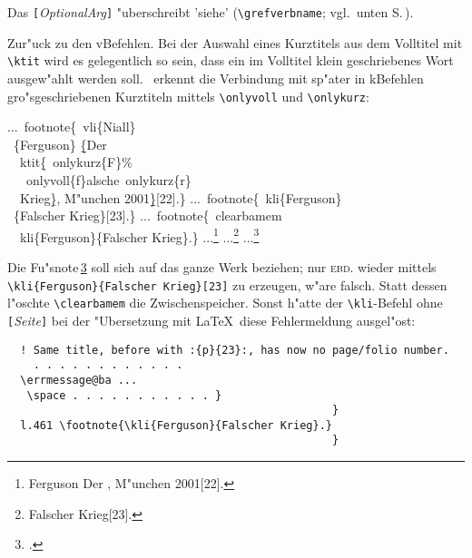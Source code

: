 \documentclass[12pt,a4paper]{article}
\newcommand{\pbs}{\string\ \unskip}
\newcommand{\bs}{\protect\pbs}
\begin{document}
\noindent
Das \texttt{[}\textit{OptionalArg}\texttt{]} "uberschreibt 'siehe'
(\verb|\grefverbname|; vgl.\ unten S.\,\pageref{grefverbname}). 


\vspace{2ex}\noindent
Zur"uck zu den v\fhy Befehlen. Bei der Auswahl eines Kurztitels aus
dem Volltitel mit \verb|\ktit| wird es gelegentlich so sein, dass ein im
Volltitel klein geschriebenes Wort ausgew"ahlt werden soll. \BibArts\
erkennt die Verbindung mit sp"ater in k\fhy Befehlen gro"sgeschriebenen 
Kurztiteln mittels \verb|\onlyvoll| und \verb|\onlykurz|:

\label{Ferguson}%
\Doppelbox
{...\bs footnote\{\bs vli\{Niall\}
  \\ \ \{Ferguson\} \b{\b{\{}}Der
  \\ \ \bs ktit\b{\{}\bs onlykurz\{F\}\%
  \\ \ \ \bs onlyvoll\{f\}alsche\bs onlykurz\{r\} 
  \\ \ \ Krieg\b{\}}, M"unchen 2001\b{\b{\}}}[22].\}
 ...\bs footnote\{\bs kli\{Ferguson\}
   \\ \ \{Falscher Krieg\}[23].\}
 ...\bs footnote\{\bs clearbamem 
 \\ \ \bs kli\{Ferguson\}\{Falscher Krieg\}.\} 
}
{...\footnote{
      {Ferguson} {Der
     ,
            M"unchen 2001}[22].}
 ...\footnote{
      {Falscher Krieg}[23].}
 ...\footnote{\clearbamem {}.\label{clearbamem}} 
}

\vspace{.5ex}\noindent 
Die Fu"snote\,\ref{clearbamem} soll sich auf das ganze 
Werk beziehen; nur \textsc{ebd.} wieder mittels \verb|\kli{Ferguson}{Falscher Krieg}[23]|
zu erzeugen, w"are falsch. Statt dessen l"oschte \verb|\clearbamem| die 
Zwischenspeicher. Sonst h"atte der \verb|\kli|-Befehl ohne \verb|[|\textit{Seite}\verb|]|
bei der "Ubersetzung mit \LaTeX\ diese Fehlermeldung ausgel"ost:

\vspace{0.5ex}\label{before}
{\scriptsize\begin{verbatim}
  ! Same title, before with :{p}{23}:, has now no page/folio number.
    . . . . . . . . . . . .
  \errmessage@ba ...
   \space . . . . . . . . . . . }
                                                  }
  l.461 \footnote{\kli{Ferguson}{Falscher Krieg}.}
                                                  }
\end{verbatim}}
\end{document}
